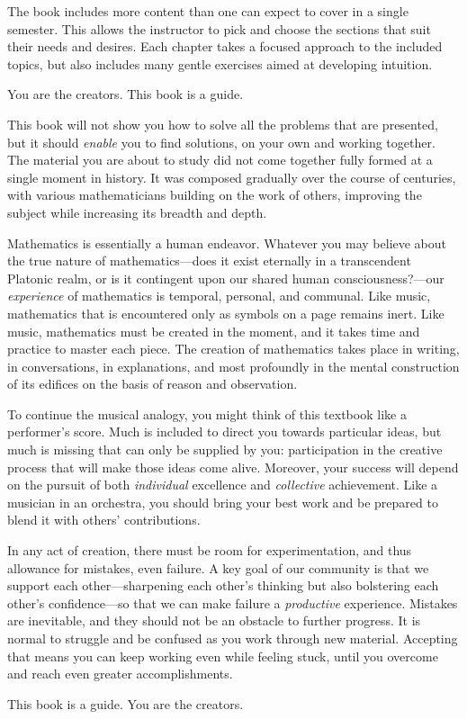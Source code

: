 The book includes more content than one can expect to cover in a single semester. This allows the instructor to pick and choose the sections that suit their needs and desires. Each chapter takes a focused approach to the included topics, but also includes many gentle exercises aimed at developing intuition.


You are the creators. This book is a guide.

This book will not show you how to solve all the problems that are presented, but it should \emph{enable} you to find solutions, on your own and working together. The material you are about to study did not come together fully formed at a single moment in history. It was composed gradually over the course of centuries, with various mathematicians building on the work of others, improving the subject while increasing its breadth and depth.

Mathematics is essentially a human endeavor. Whatever you may believe about the true nature of mathematics---does it exist eternally in a transcendent Platonic realm, or is it contingent upon our shared human consciousness?---our \emph{experience} of mathematics is temporal, personal, and communal. Like music, mathematics that is encountered only as symbols on a page remains inert. Like music, mathematics must be created in the moment, and it takes time and practice to master each piece. The creation of mathematics takes place in writing, in conversations, in explanations, and most profoundly in the mental construction of its edifices on the basis of reason and observation.

To continue the musical analogy, you might think of this textbook like a performer's score. Much is included to direct you towards particular ideas, but much is missing that can only be supplied by you: participation in the creative process that will make those ideas come alive. Moreover, your success will depend on the pursuit of both \emph{individual} excellence and \emph{collective} achievement. Like a musician in an orchestra, you should bring your best work and be prepared to blend it with others' contributions.

In any act of creation, there must be room for experimentation, and thus allowance for mistakes, even failure. A key goal of our community is that we support each other---sharpening each other's thinking but also bolstering each other's confidence---so that we can make failure a \emph{productive} experience. Mistakes are inevitable, and they should not be an obstacle to further progress. It is normal to struggle and be confused as you work through new material. Accepting that means you can keep working even while feeling stuck, until you overcome and reach even greater accomplishments.

This book is a guide. You are the creators.